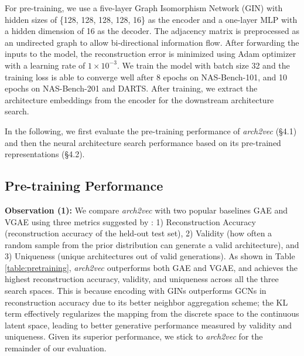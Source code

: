 For pre-training, we use a five-layer Graph Isomorphism Network (GIN) with hidden sizes of \{128, 128, 128, 128, 16\} as the encoder and a one-layer MLP with a hidden dimension of 16 as the decoder. The adjacency matrix is preprocessed as an undirected graph to allow bi-directional information flow. After forwarding the inputs to the model, the reconstruction error is minimized using Adam optimizer \cite{kingma:adam} with a learning rate of $1\times10^{-3}$. We train the model with batch size 32 and the training loss is able to converge well after 8 epochs on NAS-Bench-101, and 10 epochs on NAS-Bench-201 and DARTS. After training, we extract the architecture embeddings from the encoder for the downstream architecture search.


In the following, we first evaluate the pre-training performance of \textit{arch2vec} (\S4.1) and then the neural architecture search performance based on its pre-trained representations (\S4.2).

\vspace{-1mm}
\subsection{Pre-training Performance} \label{sec:pretraining}
\vspace{-1mm}










\textbf{Observation (1):} We compare \textit{arch2vec} with two popular baselines GAE \cite{kipf2016variational} and VGAE \cite{kipf2016variational} using three metrics suggested by \cite{zhang2019d}: 1) Reconstruction Accuracy (reconstruction accuracy of the held-out test set), 2) Validity (how often a random sample from the prior distribution can generate a valid architecture), and 3) Uniqueness (unique architectures out of valid generations). As shown in Table \ref{table:pretraining}, \textit{arch2vec} outperforms both GAE and VGAE, and achieves the highest reconstruction accuracy, validity, and uniqueness across all the three search spaces. This is because encoding with GINs outperforms GCNs in reconstruction accuracy due to its better neighbor aggregation scheme; the KL term effectively regularizes the mapping from the discrete space to the continuous latent space, leading to better generative performance measured by validity and uniqueness. Given its superior performance, we stick to \textit{arch2vec} for the remainder of our evaluation.    





